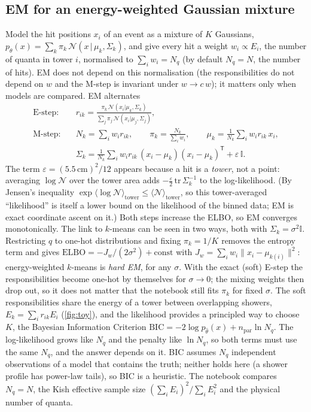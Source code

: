 \documentclass[a4paper,12pt]{article}
\begin{document}
\subsection*{EM for an energy-weighted Gaussian mixture}

Model the hit positions $x_i$ of an event as a mixture of $K$ Gaussians, $p_\theta(x)=\sum_k \pi_k\,\mathcal{N}(x\,|\,\mu_k,\Sigma_k)$,
and give every hit a weight $w_i\propto E_i$, the number of quanta in tower $i$, normalised to $\sum_i w_i = N_q$ (by default $N_q=N$, the number of hits).
EM does not depend on this normalisation (the responsibilities do not depend on $w$ and the M-step is invariant under $w\to c\,w$); it matters only when models are compared. EM alternates
\begin{align}
\text{E-step:}\quad & r_{ik} = \frac{\pi_k\,\mathcal{N}(x_i|\mu_k,\Sigma_k)}{\sum_j \pi_j\,\mathcal{N}(x_i|\mu_j,\Sigma_j)}, \\
\text{M-step:}\quad & N_k=\sum_i w_i r_{ik},\qquad \pi_k = \frac{N_k}{\sum_i w_i},\qquad
\mu_k=\frac{1}{N_k}\sum_i w_i r_{ik}\,x_i, \nonumber\\
& \Sigma_k=\frac{1}{N_k}\sum_i w_i r_{ik}\,(x_i-\mu_k)(x_i-\mu_k)^\mathsf{T}+\varepsilon\,\mathbb{I}.
\end{align}
The term $\varepsilon=(5.5\,\text{cm})^2/12$ appears because a hit is a \emph{tower}, not a point: averaging $\log\mathcal{N}$ over the tower area adds $-\tfrac{\varepsilon}{2}\,\mathrm{tr}\,\Sigma_k^{-1}$ to the log-likelihood.
(By Jensen's inequality $\exp\langle\log\mathcal{N}\rangle_\text{tower}\le\langle\mathcal{N}\rangle_\text{tower}$, so this tower-averaged ``likelihood'' is itself a lower bound on the likelihood of the binned data; EM is exact coordinate ascent on it.)
Both steps increase the ELBO, so EM converges monotonically.
The link to $k$-means can be seen in two ways, both with $\Sigma_k=\sigma^2\mathbb{I}$. Restricting $q$ to one-hot distributions and fixing $\pi_k=1/K$ removes the entropy term and gives
$\mathrm{ELBO} = -J_w/(2\sigma^2)+\text{const}$ with $J_w=\sum_i w_i\lVert x_i-\mu_{k(i)}\rVert^2$: energy-weighted $k$-means is \emph{hard EM}, for any $\sigma$.
With the exact (soft) E-step the responsibilities become one-hot by themselves for $\sigma\to 0$; the mixing weights then drop out, so it does not matter that the notebook still fits $\pi_k$ for fixed $\sigma$.
The soft responsibilities share the energy of a tower between overlapping showers, $E_k=\sum_i r_{ik}E_i$ (\cref{fig:toy}),
and the likelihood provides a principled way to choose $K$, the Bayesian Information Criterion $\mathrm{BIC}=-2\log p_{\hat\theta}(x)+n_\mathrm{par}\ln N_q$.
The log-likelihood grows like $N_q$ and the penalty like $\ln N_q$, so both terms must use the same $N_q$, and the answer depends on it.
BIC assumes $N_q$ independent observations of a model that contains the truth; neither holds here (a shower profile has power-law tails), so BIC is a heuristic.
The notebook compares $N_q=N$, the Kish effective sample size $(\sum_i E_i)^2/\sum_i E_i^2$ and the physical number of quanta.
\end{document}
